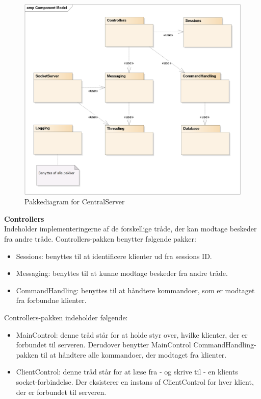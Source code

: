 \begin{figure}[H]
    \centering
    \includegraphics[width=1\textwidth]{../Projektdokumtation/Systemdesign/CentralServer/Images/Packages.png}
    \caption{Pakkediagram for CentralServer}
    \label{fig:CSPackages}
\end{figure}


\textbf{Controllers}\\
Indeholder implementeringerne af de forskellige tråde, der kan modtage beskeder fra andre tråde. Controllers-pakken benytter følgende pakker:

\begin{itemize}
	\item Sessions: benyttes til at identificere klienter ud fra sessions ID.
	\item Messaging: benyttes til at kunne modtage beskeder fra andre tråde.
	\item CommandHandling: benyttes til at håndtere kommandoer, som er modtaget fra forbundne klienter.
\end{itemize}

Controllers-pakken indeholder følgende:

\begin{itemize}
	\item MainControl: denne tråd står for at holde styr over, hvilke klienter, der er forbundet til serveren. Derudover benytter MainControl CommandHandling-pakken til at håndtere alle kommandoer, der modtaget fra klienter.
	\item ClientControl: denne tråd står for at læse fra - og skrive til - en klients socket-forbindelse. Der eksisterer en instans af ClientControl for hver klient, der er forbundet til serveren.
\end{itemize}


